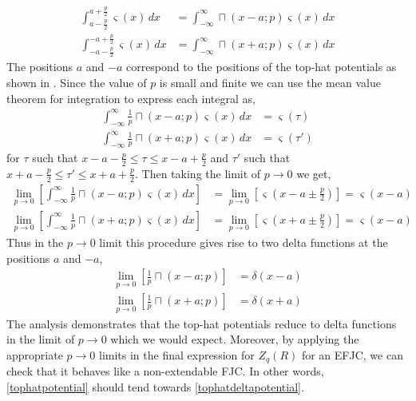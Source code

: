 %
\begin{align}
\int_{a-\frac{p}{2}}^{a+\frac{p}{2}}\varsigma(x)\, dx & =\int_{-\infty}^{\infty}\sqcap\left(x-a;p\right)\varsigma(x)\, dx\\
\int_{-a-\frac{p}{2}}^{-a+\frac{p}{2}}\varsigma(x)\, dx & =\int_{-\infty}^{\infty}\sqcap\left(x+a;p\right)\varsigma(x)\, dx
\end{align}
%
The positions $a$ and $-a$ correspond to the positions of the top-hat potentials as shown in . Since the value of $p$ is small and finite we can use the mean value theorem for integration to express each integral as,
%
\begin{align}
\int_{-\infty}^{\infty}\frac{1}{p}\sqcap\left(x-a;p\right)\varsigma(x)\, dx & =\varsigma\left(\tau\right)\\
\int_{-\infty}^{\infty}\frac{1}{p}\sqcap\left(x+a;p\right)\varsigma(x)\, dx & =\varsigma\left(\tau'\right)
\end{align}
%
for $\tau$ such that $x-a-\frac{p}{2}\leq\tau\leq x-a+\frac{p}{2}$ and $\tau'$ such that $x+a-\frac{p}{2}\leq\tau'\leq x+a+\frac{p}{2}$. Then taking the limit of $p\rightarrow0$ we get,
%
\begin{align}
\lim_{p\to0}\left[\int_{-\infty}^{\infty}\frac{1}{p}\sqcap\left(x-a;p\right)\varsigma(x)\, dx\right] & =\lim_{p\to0}\left[\varsigma\left(x-a\pm\frac{p}{2}\right)\right] = \varsigma\left(x-a\right)\\
\lim_{p\to0}\left[\int_{-\infty}^{\infty}\frac{1}{p}\sqcap\left(x+a;p\right)\varsigma(x)\, dx\right] & =\lim_{p\to0}\left[\varsigma\left(x+a\pm\frac{p}{2}\right)\right] = \varsigma\left(x-a\right)
\end{align}
%
Thus in the $p \rightarrow 0$ limit this procedure gives rise to two delta functions at the positions $a$
and $-a$,
%
\begin{align}
\lim_{p\to0}\left[\frac{1}{p}\sqcap\left(x-a;p\right)\right] & =\delta\left(x-a\right)\\
\lim_{p\to0}\left[\frac{1}{p}\sqcap\left(x+a;p\right)\right] & =\delta\left(x+a\right)
\end{align}
%
The analysis demonstrates that the top-hat potentials reduce to delta functions in the limit of $p\rightarrow0$ which we would expect. Moreover, by applying the appropriate $p\rightarrow0$ limits in the final expression for $Z_{q}\left(R\right)$ for an EFJC, we can check that it behaves like a non-extendable FJC. In other words, \eqref{tophatpotential} should tend towards \eqref{tophatdeltapotential}.
%

